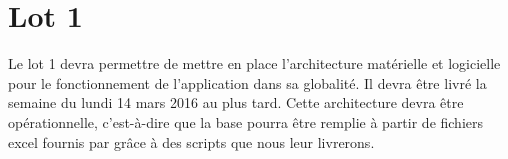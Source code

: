 \section{Lot 1}
	Le lot 1 devra permettre de mettre en place l'architecture matérielle et logicielle pour le fonctionnement de l'application dans sa globalité. Il devra être livré la semaine du lundi 14 mars 2016 au plus tard. Cette architecture devra être opérationnelle, c'est-à-dire que la base pourra être remplie à partir de fichiers excel fournis par \nomClient{} grâce à des scripts que nous leur livrerons.